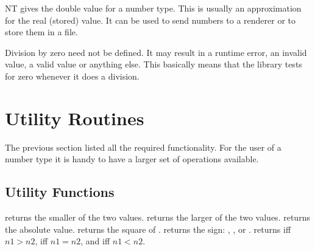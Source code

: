 \begin{ccClass} {NT}
         {gives the double value for a number type.
          This is usually an approximation for the real (stored) value.
          It can be used to send numbers to a renderer or to store them 
          in a file.}


       {}
\ccGlue
{}
       {%
   Division by zero need not be defined. It may result in a runtime error, an
   invalid value, a valid value or anything else. This basically means that the
   library tests for zero whenever it does a division.}

%


\section{Utility Routines}

The previous section listed all the required functionality.
For the user of a number type it is handy to have a larger set of
operations available.

\subsection{Utility Functions}


{returns the smaller of the two values.}
\ccGlue
{}
{returns the larger of the two values.}
\ccGlue
{}
{returns the absolute value.}
\ccGlue
{}
{returns the square of .}
\ccGlue
{}
{returns the sign: , , or .}
\ccGlue
{}
{}
\ccGlue
{}
{}
\ccGlue
{}
{}
\ccGlue
{}
{}
\ccGlue
{}
{returns  iff $n1>n2$,  iff $n1=n2$, and  iff $n1<n2$.}


\end{ccClass}
